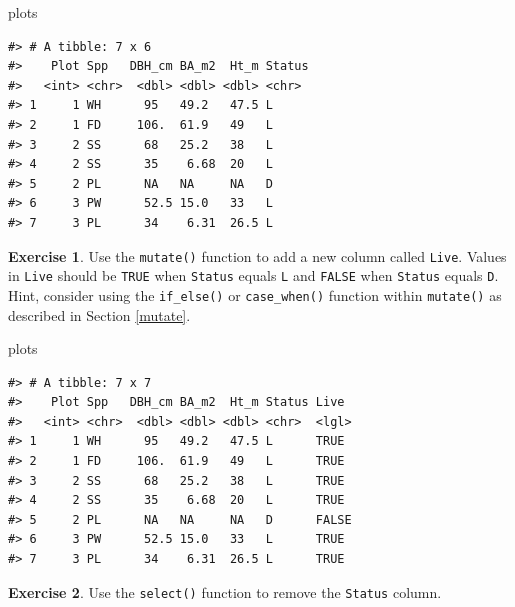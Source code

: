 \documentclass[
  11pt,
]{krantz}
\newenvironment{Shaded}{\begin{snugshade}}{\end{snugshade}}
\newcommand{\NormalTok}[1]{#1}
\theoremstyle{definition}
\theoremstyle{definition}
\theoremstyle{definition}
\newtheorem{exercise}{Exercise}[chapter]
\theoremstyle{definition}
\theoremstyle{remark}
\begin{document}
\begin{Shaded}
\begin{Highlighting}[]
\NormalTok{plots}
\end{Highlighting}
\end{Shaded}

\begin{verbatim}
#> # A tibble: 7 x 6
#>    Plot Spp   DBH_cm BA_m2  Ht_m Status
#>   <int> <chr>  <dbl> <dbl> <dbl> <chr> 
#> 1     1 WH      95   49.2   47.5 L     
#> 2     1 FD     106.  61.9   49   L     
#> 3     2 SS      68   25.2   38   L     
#> 4     2 SS      35    6.68  20   L     
#> 5     2 PL      NA   NA     NA   D     
#> 6     3 PW      52.5 15.0   33   L     
#> 7     3 PL      34    6.31  26.5 L
\end{verbatim}

\begin{exercise}
\protect\hypertarget{exr:dplyr11}{}\label{exr:dplyr11}Use the \texttt{mutate()} function to add a new column called \texttt{Live}. Values in \texttt{Live} should be \texttt{TRUE} when \texttt{Status} equals \texttt{L} and \texttt{FALSE} when \texttt{Status} equals \texttt{D}. Hint, consider using the \texttt{if\_else()} or \texttt{case\_when()} function within \texttt{mutate()} as described in Section \ref{mutate}.
\end{exercise}

\begin{Shaded}
\begin{Highlighting}[]
\NormalTok{plots}
\end{Highlighting}
\end{Shaded}

\begin{verbatim}
#> # A tibble: 7 x 7
#>    Plot Spp   DBH_cm BA_m2  Ht_m Status Live 
#>   <int> <chr>  <dbl> <dbl> <dbl> <chr>  <lgl>
#> 1     1 WH      95   49.2   47.5 L      TRUE 
#> 2     1 FD     106.  61.9   49   L      TRUE 
#> 3     2 SS      68   25.2   38   L      TRUE 
#> 4     2 SS      35    6.68  20   L      TRUE 
#> 5     2 PL      NA   NA     NA   D      FALSE
#> 6     3 PW      52.5 15.0   33   L      TRUE 
#> 7     3 PL      34    6.31  26.5 L      TRUE
\end{verbatim}

\begin{exercise}
\protect\hypertarget{exr:dplyr12}{}\label{exr:dplyr12}Use the \texttt{select()} function to remove the \texttt{Status} column.
\end{exercise}
\end{document}
